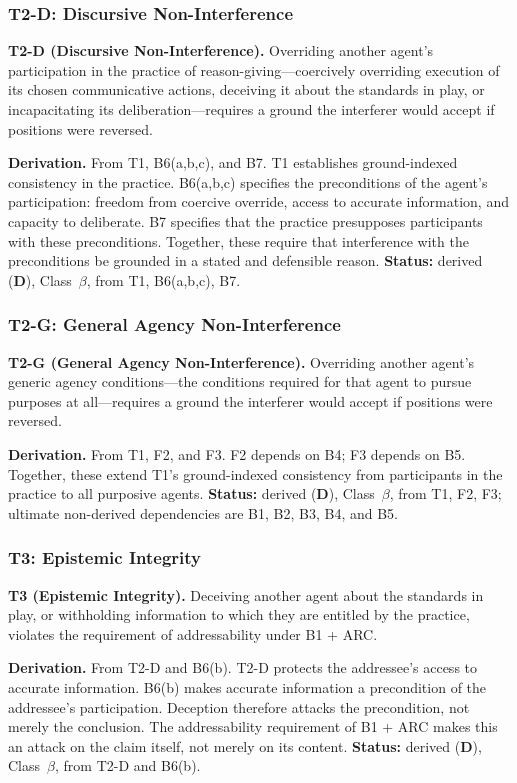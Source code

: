 \documentclass[11pt]{article}
\newcommand{\statusD}{\textcolor{stD}{\textbf{D}}}
\newcommand{\cb}{\texorpdfstring{Class~$\beta$}{Class beta}}
\begin{document}
\subsubsection{T2-D: Discursive Non-Interference}
\begin{paperbox}
\textbf{T2-D (Discursive Non-Interference).} Overriding another agent's participation in the practice of reason-giving---coercively overriding execution of its chosen communicative actions, deceiving it about the standards in play, or incapacitating its deliberation---requires a ground the interferer would accept if positions were reversed.
\end{paperbox}
\textbf{Derivation.} From T1, B6(a,b,c), and B7. T1 establishes ground-indexed consistency in the practice. B6(a,b,c) specifies the preconditions of the agent's participation: freedom from coercive override, access to accurate information, and capacity to deliberate. B7 specifies that the practice presupposes participants with these preconditions. Together, these require that interference with the preconditions be grounded in a stated and defensible reason. \textbf{Status:} derived (\statusD{}), \cb{}, from T1, B6(a,b,c), B7.

\subsubsection{T2-G: General Agency Non-Interference}
\begin{paperbox}
\textbf{T2-G (General Agency Non-Interference).} Overriding another agent's generic agency conditions---the conditions required for that agent to pursue purposes at all---requires a ground the interferer would accept if positions were reversed.
\end{paperbox}
\textbf{Derivation.} From T1, F2, and F3. F2 depends on B4; F3 depends on B5. Together, these extend T1's ground-indexed consistency from participants in the practice to all purposive agents. \textbf{Status:} derived (\statusD{}), \cb{}, from T1, F2, F3; ultimate non-derived dependencies are B1, B2, B3, B4, and B5.

\subsubsection{T3: Epistemic Integrity}
\begin{paperbox}
\textbf{T3 (Epistemic Integrity).} Deceiving another agent about the standards in play, or withholding information to which they are entitled by the practice, violates the requirement of addressability under B1 + ARC.
\end{paperbox}
\textbf{Derivation.} From T2-D and B6(b). T2-D protects the addressee's access to accurate information. B6(b) makes accurate information a precondition of the addressee's participation. Deception therefore attacks the precondition, not merely the conclusion. The addressability requirement of B1 + ARC makes this an attack on the claim itself, not merely on its content. \textbf{Status:} derived (\statusD{}), \cb{}, from T2-D and B6(b).
\end{document}
